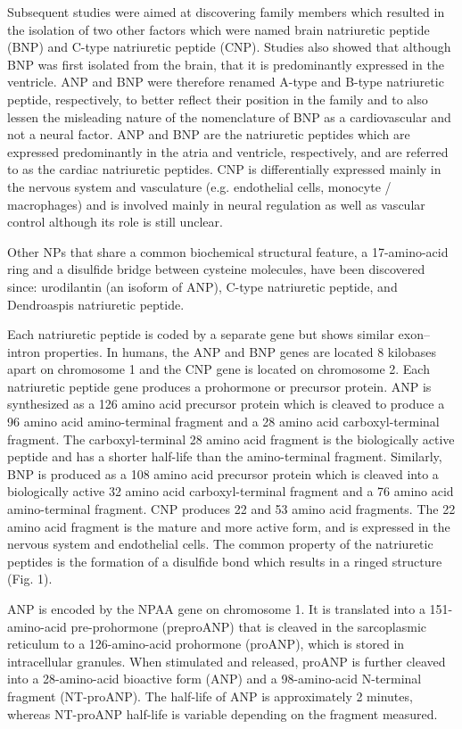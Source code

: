\documentclass[14pt,a4paper,onecolumn]{extarticle}
\begin{document}
Subsequent studies were aimed at discovering family members which resulted in the isolation of two other factors which were named brain natriuretic peptide (BNP) and C-type natriuretic peptide (CNP). Studies also showed that although BNP was first isolated from the brain, that it is predominantly expressed in the ventricle. ANP and BNP were therefore renamed A-type and B-type natriuretic peptide, respectively, to better reflect their position in the family and to also lessen the misleading nature of the nomenclature of BNP as a cardiovascular and not a neural factor. ANP and BNP are the natriuretic peptides which are expressed predominantly in the atria and ventricle, respectively, and are referred to as the cardiac natriuretic peptides. CNP is differentially expressed mainly in the nervous system and vasculature (e.g. endothelial cells, monocyte / macrophages) and is involved mainly in neural regulation as well as vascular control although its role is still unclear. \citep{Suzuki2001} %

Other NPs that share a common biochemical structural feature, a 17-amino-acid ring and a disulfide bridge between cysteine molecules, have been discovered since: urodilantin (an isoform of ANP), C-type natriuretic peptide, and Dendroaspis natriuretic peptide. \citep{Gaggin2014} %

Each natriuretic peptide is coded by a separate gene but shows similar exon--intron properties. In humans, the ANP and BNP genes are located 8 kilobases apart on chromosome 1 and the CNP gene is located on chromosome 2. Each natriuretic peptide gene produces a prohormone or precursor protein. ANP is synthesized as a 126 amino acid precursor protein which is cleaved to produce a 96 amino acid amino-terminal fragment and a 28 amino acid carboxyl-terminal fragment. The carboxyl-terminal 28 amino acid fragment is the biologically active peptide and has a shorter half-life than the amino-terminal fragment. Similarly, BNP is produced as a 108 amino acid precursor protein which is cleaved into a biologically active 32 amino acid carboxyl-terminal fragment and a 76 amino acid amino-terminal fragment. CNP produces 22 and 53 amino acid fragments. The 22 amino acid fragment is the mature and more active form, and is expressed in the nervous system and endothelial cells. The common property of the natriuretic peptides is the formation of a disulfide bond which results in a ringed structure (Fig. 1).\citep{Suzuki2001} %

ANP is encoded by the NPAA gene on chromosome 1. It is translated into a 151-amino-acid pre-prohormone (preproANP) that is cleaved in the sarcoplasmic reticulum to a 126-amino-acid prohormone (proANP), which is stored in intracellular granules.  When stimulated and released, proANP is further cleaved into a 28-amino-acid bioactive form (ANP) and a 98-amino-acid N-terminal fragment (NT-proANP). The half-life of ANP is approximately 2 minutes, whereas NT-proANP half-life is variable depending on the fragment measured. \citep{Volpe2016} %
\end{document}
